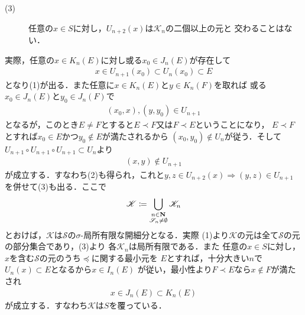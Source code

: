 \begin{prf}
\begin{description}
\begin{description}
					\item[(3)] 任意の$x \in S$に対し，$U_{n+2}(x)$は$\mathscr{K}_n$の二個以上の元と
						交わることはない．
				\end{description}
				実際，任意の$x \in K_n(E)$に対し或る$x_0 \in J_n(E)$が存在して
				\begin{align}
					x \in U_{n+1}(x_0) \subset U_n(x_0) \subset E
				\end{align}
				となり(1)が出る．また任意に$x \in K_n(E)$と$y \in K_n(F)$を取れば
				或る$x_0 \in J_n(E)$と$y_0 \in J_n(F)$で
				\begin{align}
					(x_0,x),(y,y_0) \in U_{n+1}
				\end{align}
				となるが，このとき$E \neq F$とすると$E \prec F$又は$F \prec E$ということになり，
				$E \prec F$とすれば$x_0 \in E$かつ$y_0 \notin E$が満たされるから
				$(x_0,y_0) \notin U_n$が従う．そして$U_{n+1} \circ U_{n+1} \circ U_{n+1} \subset U_n$より
				\begin{align}
					(x,y) \notin U_{n+1}
				\end{align}
				が成立する．すなわち(2)も得られ，これと$y,z \in U_{n+2}(x) \Longrightarrow (y,z) \in U_{n+1}$
				を併せて(3)も出る．ここで
				\begin{align}
					\mathscr{K} \coloneqq 
					\bigcup_{\substack{n \in \mathbf{N} \\ \mathscr{S}_n \neq \emptyset}} \mathscr{K}_n
				\end{align}
				とおけば，$\mathscr{K}$は$\mathscr{S}$の$\sigma$-局所有限な開細分となる．実際
				(1)より$\mathscr{K}$の元は全て$\mathscr{S}$の元の部分集合であり，(3)より
				各$\mathscr{K}_n$は局所有限である．また
				任意の$x \in S$に対し，$x$を含む$\mathscr{S}$の元のうち$\preceq$に関する最小元を
				$E$とすれば，十分大きい$n$で$U_n(x) \subset E$となるから$x \in I_n(E)$
				が従い，最小性より$F \prec E$なら$x \notin F$が満たされ
				\begin{align}
					x \in J_n(E) \subset K_n(E)
				\end{align}
				が成立する．すなわち$\mathscr{K}$は$S$を覆っている．
				

\end{description}
\end{prf}
